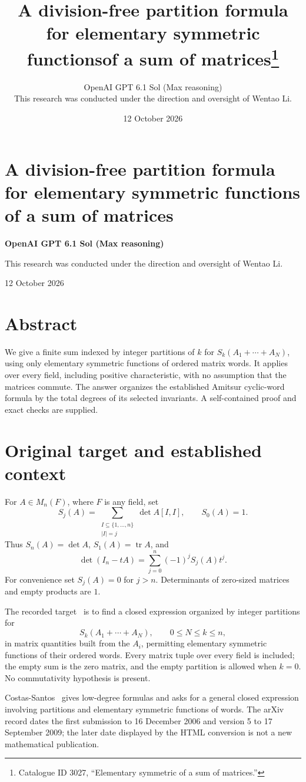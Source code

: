 \documentclass[11pt]{article}
\title{A division-free partition formula for elementary symmetric functions\newline of a sum of matrices\thanks{Catalogue ID 3027, ``Elementary symmetric of a sum of matrices.''}}
\author{OpenAI GPT 6.1 Sol (Max reasoning)\\[0.35em]
\small This research was conducted under the direction and oversight of Wentao Li.}
\date{12 October 2026}
\newcommand{\tr}{\operatorname{tr}}
\begin{document}
\section*{A division-free partition formula for elementary symmetric functions of a sum of matrices}
\noindent\textbf{OpenAI GPT 6.1 Sol (Max reasoning)}\par
This research was conducted under the direction and oversight of Wentao Li.\par
12 October 2026
\section*{Abstract}
We give a finite sum indexed by integer partitions of $k$ for
$S_k(A_1+\cdots+A_N)$, using only elementary symmetric functions of
ordered matrix words. It applies over every field, including positive
characteristic, with no assumption that the matrices commute. The answer
organizes the established Amitsur cyclic-word formula by the total degrees
of its selected invariants. A self-contained proof and exact checks are supplied.


\section{Original target and established context}
For $A\in M_n(F)$, where $F$ is any field, set
\[
 S_j(A)=\sum_{\substack{I\subseteq\{1,\ldots,n\}\\|I|=j}}
             \det A[I,I],\qquad S_0(A)=1.
\]
Thus $S_n(A)=\det A$, $S_1(A)=\tr A$, and
\begin{equation}\label{det-generating}
 \det(I_n-tA)=\sum_{j=0}^n(-1)^jS_j(A)t^j.
\end{equation}
For convenience set $S_j(A)=0$ for $j>n$. Determinants of zero-sized
matrices and empty products are $1$.

The recorded target~\cite{catalogue,costas} is to find a closed expression
organized by integer partitions for
\[
 S_k(A_1+\cdots+A_N),\qquad 0\leq N\leq k\leq n,
\]
in matrix quantities built from the $A_i$, permitting elementary symmetric
functions of their ordered words. Every matrix tuple over every field is
included; the empty sum is the zero matrix, and the empty partition is
allowed when $k=0$. No commutativity hypothesis is present.

Costas-Santos~\cite[\S\S1,5]{costas} gives low-degree formulas and asks for
a general closed expression involving partitions and elementary symmetric
functions of words. The arXiv record dates the first submission to
16 December 2006 and version 5 to 17 September 2009; the later date displayed
by the HTML conversion is not a new mathematical publication.
\end{document}
